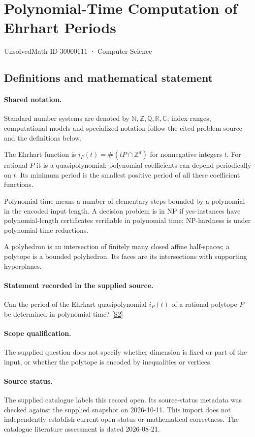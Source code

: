 \documentclass[11pt]{article}
\newcommand{\sref}[2]{\hyperlink{source:#1:#2}{[S#2]}}
\begin{document}
\setcounter{section}{30000110}
\section{Polynomial-Time Computation of Ehrhart Periods}\label{30000111}
{\small\sffamily UnsolvedMath ID 30000111 · Computer Science}
\subsection{Definitions and mathematical statement}

\paragraph{Shared notation.}Standard number systems are denoted by $\mathbb N,\mathbb Z,\mathbb Q,\mathbb R,\mathbb C$; index ranges, computational models and specialized notation follow the cited problem source and the definitions below.


The Ehrhart function is $i_P(t)=\#(tP\cap\mathbb Z^d)$ for nonnegative integers $t$. For rational $P$ it is a quasipolynomial: polynomial coefficients can depend periodically on $t$. Its minimum period is the smallest positive period of all these coefficient functions.

Polynomial time means a number of elementary steps bounded by a polynomial in the encoded input length. A decision problem is in $\mathrm{NP}$ if yes-instances have polynomial-length certificates verifiable in polynomial time; NP-hardness is under polynomial-time reductions.

A polyhedron is an intersection of finitely many closed affine half-spaces; a polytope is a bounded polyhedron. Its faces are its intersections with supporting hyperplanes.
\paragraph{Statement recorded in the supplied source.}
Can the period of the Ehrhart quasipolynomial $i_P(t)$ of a rational polytope $P$ be determined in polynomial time? \sref{30000111}{2}
\paragraph{Scope qualification.}
The supplied question does not specify whether dimension is fixed or part of the input, or whether the polytope is encoded by inequalities or vertices.
\paragraph{Source status.}
The supplied catalogue labels this record open. Its source-status metadata was checked against the supplied snapshot on 2026-10-11. This import does not independently establish current open status or mathematical correctness. The catalogue literature assessment is dated 2026-08-21.
\end{document}
